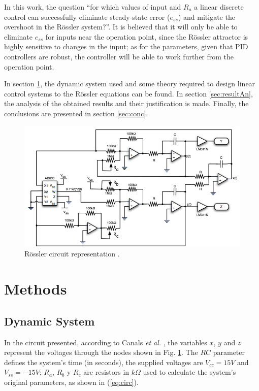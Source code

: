 In this work, the question ``for which values of input and $R_a$ a linear discrete control can successfully eliminate steady-state error ($e_{ss}$) and mitigate the overshoot in the Rössler system?''. It is believed that it will only be able to eliminate $e_{ss}$ for inputs near the operation point, since the Rössler attractor is highly sensitive to changes in the input; as for the parameters, given that PID controllers are robust, the controller will be able to work further from the operation point.


In section \ref{sec:meth}, the dynamic system used and some theory required to design linear control systems to the Rössler equations can be found. In section \ref{sec:resultAn}, the analysis of the obtained results and their justification is made. Finally, the conclusions are presented in section \ref{sec:conc}.

\begin{figure}
    \centering
    \includegraphics[scale=0.325]{files/Circuito.png}
    \caption{R\"ossler circuit representation \cite{canals2014random}.}
    \label{fig:circuito}
\end{figure}
\section{Methods}\label{sec:meth}
\subsection{Dynamic System}
In the circuit presented, according to Canals \textit{et al.} \cite{canals2014random}, the variables $x$, $y$ and $z$ represent the voltages through the nodes shown in Fig. \ref{fig:circuito}. The $RC$ parameter defines the system's time (in seconds), the supplied voltages are $V_{cc}=15V$ and $V_{ss}=-15V$; $R_a$, $R_b$ y $R_c$ are resistors in $k\Omega$ used to calculate the system's original parameters, as shown in (\ref{eq:circ}).


